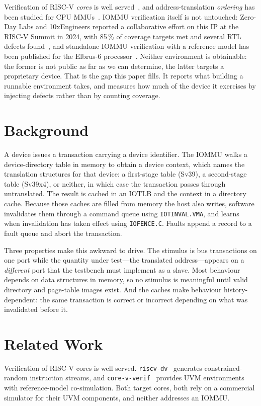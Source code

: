 \documentclass[conference]{IEEEtran}
\newcommand{\cmd}[1]{\mbox{\texttt{#1}}}
\begin{document}
Verification of RISC-V \emph{cores} is well served~\cite{riscvdv,corevverif},
and address-translation \emph{ordering} has been studied for CPU
MMUs~\cite{coatcheck,transform,rtlcheck}. IOMMU verification itself is not
untouched: Zero-Day Labs and 10xEngineers reported a collaborative effort on
this IP at the RISC-V Summit in 2024, with 85\,\% of coverage targets met and
several RTL defects found~\cite{zdl10x}, and standalone IOMMU verification with
a reference model has been published for the Elbrus-6
processor~\cite{elbrus}. Neither environment is obtainable: the former is not
public as far as we can determine, the latter targets a proprietary device. That
is the gap this paper fills. It reports what building a runnable environment
takes, and measures how much of the device it exercises by injecting defects
rather than by counting coverage.

\section{Background}
A device issues a transaction carrying a device identifier. The IOMMU walks a
device-directory table in memory to obtain a device context, which names the
translation structures for that device: a first-stage table (Sv39), a
second-stage table (Sv39x4), or neither, in which case the transaction passes
through untranslated. The result is cached in an IOTLB and the context in a
directory cache. Because those caches are filled from memory the host also
writes, software invalidates them through a command queue using
\cmd{IOTINVAL.VMA}, and learns when invalidation has taken effect using
\cmd{IOFENCE.C}. Faults append a record to a fault queue and abort the
transaction.

Three properties make this awkward to drive. The stimulus is bus transactions on
one port while the quantity under test---the translated address---appears on a
\emph{different} port that the testbench must implement as a slave. Most
behaviour depends on data structures in memory, so no stimulus is meaningful
until valid directory and page-table images exist. And the caches make behaviour
history-dependent: the same transaction is correct or incorrect depending on
what was invalidated before it.

\section{Related Work}
Verification of RISC-V cores is well served. \texttt{riscv-dv}~\cite{riscvdv}
generates constrained-random instruction streams, and
\texttt{core-v-verif}~\cite{corevverif} provides UVM environments with
reference-model co-simulation. Both target cores, both rely on a commercial
simulator for their UVM components, and neither addresses an IOMMU.
\end{document}
